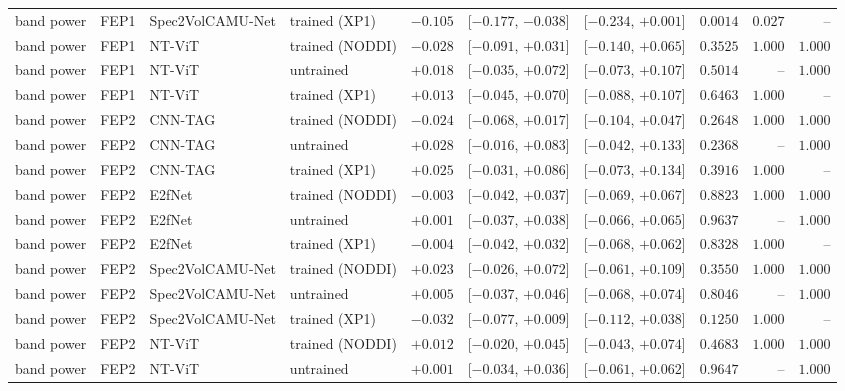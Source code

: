 \documentclass[10pt]{article}
\begin{document}
\begin{longtable}{l l l l r c c r r r}
        band power & FEP1 & Spec2VolCAMU-Net & trained (XP1) & $-0.105$ & [$-0.177$, $-0.038$] & [$-0.234$, $+0.001$] & $0.0014$ & $0.027$ & -- \\
        band power & FEP1 & NT-ViT & trained (NODDI) & $-0.028$ & [$-0.091$, $+0.031$] & [$-0.140$, $+0.065$] & $0.3525$ & $1.000$ & $1.000$ \\
        band power & FEP1 & NT-ViT & untrained & $+0.018$ & [$-0.035$, $+0.072$] & [$-0.073$, $+0.107$] & $0.5014$ & -- & $1.000$ \\
        band power & FEP1 & NT-ViT & trained (XP1) & $+0.013$ & [$-0.045$, $+0.070$] & [$-0.088$, $+0.107$] & $0.6463$ & $1.000$ & -- \\
        band power & FEP2 & CNN-TAG & trained (NODDI) & $-0.024$ & [$-0.068$, $+0.017$] & [$-0.104$, $+0.047$] & $0.2648$ & $1.000$ & $1.000$ \\
        band power & FEP2 & CNN-TAG & untrained & $+0.028$ & [$-0.016$, $+0.083$] & [$-0.042$, $+0.133$] & $0.2368$ & -- & $1.000$ \\
        band power & FEP2 & CNN-TAG & trained (XP1) & $+0.025$ & [$-0.031$, $+0.086$] & [$-0.073$, $+0.134$] & $0.3916$ & $1.000$ & -- \\
        band power & FEP2 & E2fNet & trained (NODDI) & $-0.003$ & [$-0.042$, $+0.037$] & [$-0.069$, $+0.067$] & $0.8823$ & $1.000$ & $1.000$ \\
        band power & FEP2 & E2fNet & untrained & $+0.001$ & [$-0.037$, $+0.038$] & [$-0.066$, $+0.065$] & $0.9637$ & -- & $1.000$ \\
        band power & FEP2 & E2fNet & trained (XP1) & $-0.004$ & [$-0.042$, $+0.032$] & [$-0.068$, $+0.062$] & $0.8328$ & $1.000$ & -- \\
        band power & FEP2 & Spec2VolCAMU-Net & trained (NODDI) & $+0.023$ & [$-0.026$, $+0.072$] & [$-0.061$, $+0.109$] & $0.3550$ & $1.000$ & $1.000$ \\
        band power & FEP2 & Spec2VolCAMU-Net & untrained & $+0.005$ & [$-0.037$, $+0.046$] & [$-0.068$, $+0.074$] & $0.8046$ & -- & $1.000$ \\
        band power & FEP2 & Spec2VolCAMU-Net & trained (XP1) & $-0.032$ & [$-0.077$, $+0.009$] & [$-0.112$, $+0.038$] & $0.1250$ & $1.000$ & -- \\
        band power & FEP2 & NT-ViT & trained (NODDI) & $+0.012$ & [$-0.020$, $+0.045$] & [$-0.043$, $+0.074$] & $0.4683$ & $1.000$ & $1.000$ \\
        band power & FEP2 & NT-ViT & untrained & $+0.001$ & [$-0.034$, $+0.036$] & [$-0.061$, $+0.062$] & $0.9647$ & -- & $1.000$ \\

\end{longtable}
\end{document}
